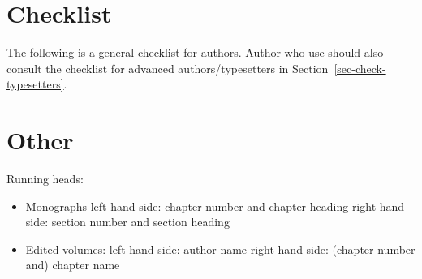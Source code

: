 \section{Checklist}

The following is a general checklist for authors. Author who use \latex should also consult the
checklist for advanced authors/typesetters in Section~\ref{sec-check-typesetters}.

\section{Other}

Running heads:
\begin{itemize}
\item Monographs
left-hand side: chapter number and chapter heading 
right-hand side: section number and section heading
\item Edited volumes:
left-hand side: author name
right-hand side: (chapter number and) chapter name
\end{itemize}


